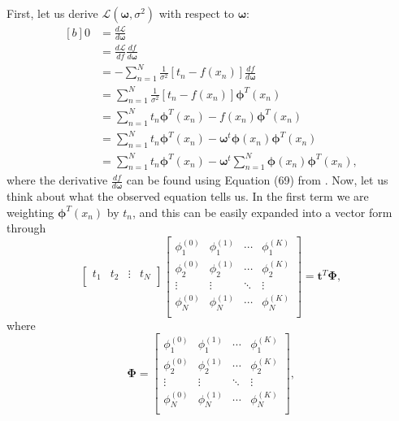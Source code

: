 \documentclass{article}
\begin{document}
First, let us derive $\mathcal{L}(\boldsymbol\omega, \sigma^2)$ with respect to $\boldsymbol\omega$:
\begin{equation}\label{eq:partial_ML_regression}
\begin{aligned}[b]
0 &= \frac{d\mathcal{L}}{d\boldsymbol\omega} \\
&= \frac{d\mathcal{L}}{df} \frac{df}{d\boldsymbol\omega} \\
&= -\sum_{n=1}^{N}\frac{1}{\sigma^2} \left[ t_n - f(x_n) \right] \frac{df}{d\boldsymbol\omega}  \\
&= \sum_{n=1}^{N}\frac{1}{\sigma^2} \left[ t_n - f(x_n) \right]\boldsymbol\phi^T(x_n)\\
&= \sum_{n=1}^{N} t_n \boldsymbol\phi^T(x_n) - f(x_n) \boldsymbol\phi^T(x_n) \\
&= \sum_{n=1}^{N} t_n \boldsymbol\phi^T(x_n) - \boldsymbol\omega^t \boldsymbol\phi(x_n) \boldsymbol\phi^T(x_n) \\
&= \sum_{n=1}^{N} t_n \boldsymbol\phi^T(x_n) - \boldsymbol\omega^t \sum_{n=1}^{N} \boldsymbol\phi(x_n) \boldsymbol\phi^T(x_n),
\end{aligned}
\end{equation}
where the derivative $\frac{df}{d\boldsymbol\omega}$ can be found using Equation (69) from \textcite{Petersen2006TheMC}. Now, let us think about what the observed equation tells us. In the first term we are weighting  $\boldsymbol\phi^T(x_n)$ by $t_n$, and this can be easily expanded into a vector form through
\begin{equation}
\begin{bmatrix}
t_1  & t_2  & \vdots & t_N \\
\end{bmatrix}
\begin{bmatrix}
\phi_1^{(0)} & \phi_1^{(1)} & \cdots & \phi_1^{(K)} \\
\phi_2^{(0)} & \phi_2^{(1)} & \cdots & \phi_2^{(K)} \\
\vdots & \vdots & \ddots & \vdots \\
\phi_N^{(0)} & \phi_N^{(1)} & \cdots & \phi_N^{(K)} \\
\end{bmatrix}
= \mathbf{t}^T\boldsymbol\Phi,
\end{equation}
where 
\begin{equation}\label{eq:Phi_matrix}
\boldsymbol\Phi = 
\begin{bmatrix}
\phi_1^{(0)} & \phi_1^{(1)} & \cdots & \phi_1^{(K)} \\
\phi_2^{(0)} & \phi_2^{(1)} & \cdots & \phi_2^{(K)} \\
\vdots & \vdots & \ddots & \vdots \\
\phi_N^{(0)} & \phi_N^{(1)} & \cdots & \phi_N^{(K)} \\
\end{bmatrix},
\end{equation}
\end{document}

